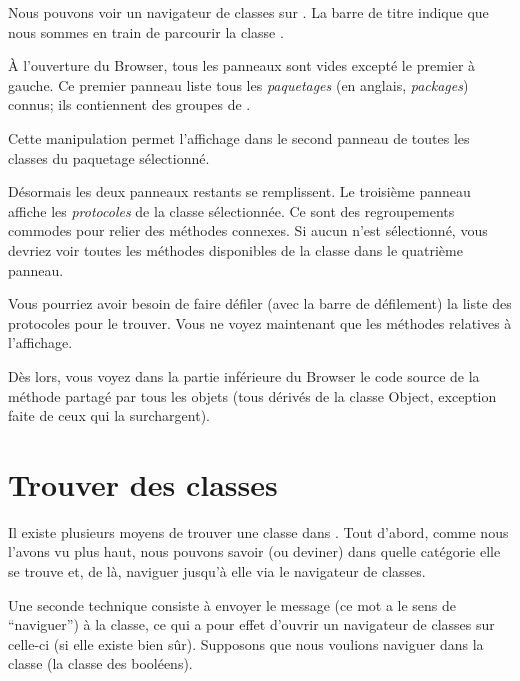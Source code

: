 \documentclass[a4paper,10pt,twoside]{book}
\begin{document}
Nous pouvons voir un navigateur de classes sur .
La barre de titre indique que nous sommes en train de parcourir la
classe .

À l'ouverture du Browser, tous les panneaux sont vides excepté le premier à gauche.
Ce premier panneau liste tous les \emph{paquetages} 
(en anglais, \emph{packages}) connus; 
ils contiennent des groupes de . %

Cette manipulation permet l'affichage dans le second panneau de toutes les
classes du paquetage sélectionné.

Désormais les deux panneaux restants se remplissent.
Le troisième panneau affiche les \emph{protocoles} de la classe
sélectionnée.
Ce sont des regroupements commodes pour relier des méthodes
connexes. Si aucun  n'est sélectionné, vous devriez
voir toutes les méthodes disponibles de la classe dans le
quatrième panneau.

Vous pourriez avoir besoin de faire défiler (avec la barre de
défilement) la liste des protocoles pour le trouver.
Vous ne voyez maintenant que les méthodes relatives à
l'affichage.

Dès lors, vous voyez dans la partie inférieure du Browser
le code source de la méthode  partagé par tous
les objets 
(tous dérivés de la classe Object, exception faite de ceux qui la surchargent).

\section{Trouver des classes}

Il existe plusieurs moyens de trouver une classe dans \pharo.
Tout d'abord, comme nous l'avons vu plus haut, nous pouvons savoir (ou
deviner) dans quelle catégorie elle se trouve et, de là, naviguer
jusqu'à elle via le navigateur de classes.

Une seconde technique consiste à envoyer le message 
(ce mot a le sens de ``naviguer'') à la classe, ce qui a pour effet
d'ouvrir un navigateur de classes sur celle-ci
(si elle existe bien sûr).
Supposons que nous voulions naviguer dans la classe 
(la classe des booléens).
\end{document}
